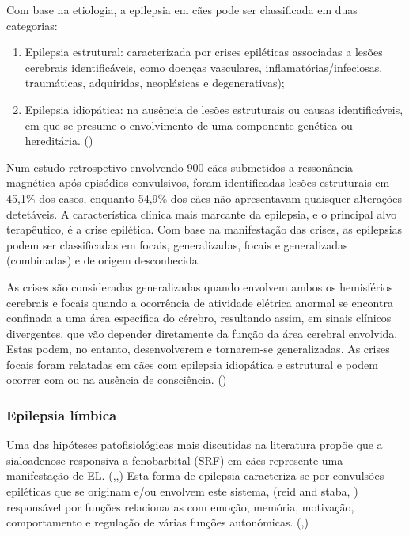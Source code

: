 Com base na etiologia, a epilepsia em cães pode ser classificada em duas categorias:
 \begin{enumerate}
    \item Epilepsia estrutural: caracterizada por crises epiléticas associadas a lesões cerebrais identificáveis, como doenças vasculares, inflamatórias/infeciosas, traumáticas, adquiridas, neoplásicas e degenerativas);
    \item  Epilepsia idiopática: na ausência de lesões estruturais ou causas identificáveis, em que se presume o envolvimento de uma componente genética ou hereditária. (\cite{Packer2015})
\end{enumerate}


Num estudo retrospetivo envolvendo 900 cães submetidos a ressonância magnética após episódios convulsivos, foram identificadas lesões estruturais em 45,1\% dos casos, enquanto 54,9\% dos cães não apresentavam quaisquer alterações detetáveis. \cite{loscher_dogs_2022}
A característica clínica mais marcante da epilepsia, e o principal alvo terapêutico, é a crise epilética. Com base na manifestação das crises, as epilepsias podem ser classificadas em focais, generalizadas, focais e generalizadas (combinadas) e de origem desconhecida. 


As crises são consideradas generalizadas quando envolvem ambos os hemisférios cerebrais e focais quando a ocorrência de atividade elétrica anormal se encontra confinada a uma área específica do cérebro, resultando assim, em sinais clínicos divergentes, que vão depender diretamente da função da área cerebral envolvida. Estas podem, no entanto, desenvolverem e tornarem-se generalizadas. As crises focais foram relatadas em cães com epilepsia idiopática e estrutural e podem ocorrer com ou na ausência de consciência. (\cite{Packer2015})


\subsubsection{Epilepsia límbica}

Uma das hipóteses patofisiológicas mais discutidas na literatura propõe que a sialoadenose responsiva a fenobarbital (SRF) em cães represente uma manifestação de EL. (\cite{Kalayanakoul2019},\cite{gibbon_phenobarbital-responsive_german_2004},\cite{gibbon_phenobarbital-responsive_german_2004}) Esta forma de epilepsia caracteriza-se por convulsões epiléticas que se originam e/ou envolvem este sistema, (reid and staba, \cite{gibbon_phenobarbital-responsive_german_2004}) responsável por funções relacionadas com emoção, memória, motivação, comportamento e regulação de várias funções autonómicas. (\cite{gibbon_phenobarbital-responsive_german_2004},\cite{Bandusena2022})


